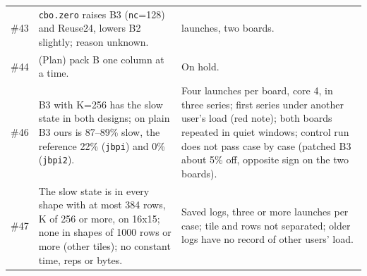 \documentclass[11pt,a4paper]{article}
\begin{document}
{\begin{tabularx}{\linewidth}{@{}l >{\raggedright\arraybackslash}X >{\raggedright\arraybackslash}p{5.2cm}@{}}
\#43 & \texttt{cbo.zero} raises B3 (\texttt{nc}=128) and Reuse24, lowers B2 slightly; reason unknown. & 168
launches, two boards. \\
\#44 & (Plan) pack B one column at a time. & On hold. \\
\#46 & B3 with K=256 has the slow state in both designs; on plain B3 ours is 87--89\% slow, the reference 22\% (\texttt{jbpi}) and 0\% (\texttt{jbpi2}). & Four launches per
board, core 4, in three series; first series under another user's load (red note); both boards repeated in quiet windows; control run does not pass case by case (patched B3
about 5\% off, opposite sign on the two boards). \\
\#47 & The slow state is in every shape with at most 384 rows, K of 256 or more, on 16x15; none in shapes of 1000 rows or more (other tiles);
no constant time, reps or bytes. & Saved logs, three or more launches per case; tile and rows not separated; older logs have no record of
other users' load. \\
\bottomrule
\end{tabularx}}
\end{document}
